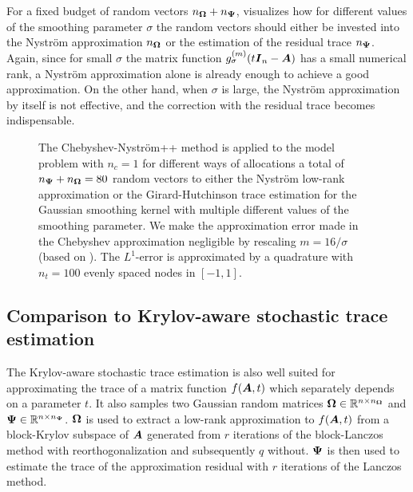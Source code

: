 For a fixed budget of random vectors $n_{\boldsymbol{\Omega}} + n_{\boldsymbol{\Psi}}$,  visualizes how for different values of the smoothing parameter $\sigma$ the random vectors should either be invested into the Nyström approximation $n_{\boldsymbol{\Omega}}$ or the estimation of the residual trace $n_{\boldsymbol{\Psi}}$. Again, since for small $\sigma$ the matrix function $g_{\sigma}^{(m)}(t \boldsymbol{I}_n - \boldsymbol{A})$ has a small numerical rank, a Nyström approximation alone is already enough to achieve a good approximation. On the other hand, when $\sigma$ is large, the Nyström approximation by itself is not effective, and the correction with the residual trace becomes indispensable.

\begin{figure}[!htpb]
    \centering
    
    \caption{The Chebyshev-Nyström++ method is applied to the model problem with $n_c = 1$ for different ways of allocations a total of $n_{\boldsymbol{\Psi}} + n_{\boldsymbol{\Omega}}=80$ random vectors to either the Nystr\"om low-rank approximation or the Girard-Hutchinson trace estimation for the Gaussian smoothing kernel with multiple different values of the smoothing parameter. We make the approximation error made in the Chebyshev approximation negligible by rescaling $m=16 / \sigma$ (based on ). The $L^1$-error is approximated by a quadrature with $n_t = 100$ evenly spaced nodes in $[-1, 1]$.}
    \label{fig:distribution}
\end{figure}

\subsection{Comparison to Krylov-aware stochastic trace estimation}
\label{subsec:krylov-aware}

The Krylov-aware stochastic trace estimation \cite{chen-2023-krylovaware-stochastic} is also well suited for approximating the trace of a matrix function $f(\boldsymbol{A}, t)$ which separately depends on a parameter $t$. It also samples two Gaussian random matrices $\boldsymbol{\Omega} \in \mathbb{R}^{n \times n_{\boldsymbol{\Omega}}}$ and $\boldsymbol{\Psi} \in \mathbb{R}^{n \times n_{\boldsymbol{\Psi}}}$. $\boldsymbol{\Omega}$ is used to extract a low-rank approximation to $f(\boldsymbol{A}, t)$ from a block-Krylov subspace of $\boldsymbol{A}$ generated from $r$ iterations of the block-Lanczos method with reorthogonalization and subsequently $q$ without. $\boldsymbol{\Psi}$ is then used to estimate the trace of the approximation residual with $r$ iterations of the Lanczos method.

